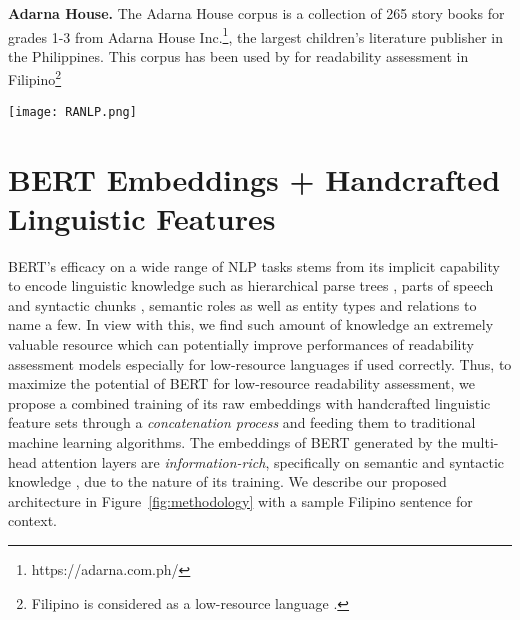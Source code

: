 \documentclass[11pt,a4paper]{article}
\begin{document}
\noindent\textbf{Adarna House.} The Adarna House corpus is a collection of 265 story books for grades 1-3 from Adarna House Inc.\footnote{https://adarna.com.ph/}, the largest children's literature publisher in the Philippines. This corpus has been used by \citet{imperial2019developing, imperial2020exploring, imperial2021application} for readability assessment in Filipino\footnote{Filipino is considered as a low-resource language \cite{cruz-etal-2020-resource,cruz-etal-2020-localization}.}



\begin{figure*}[!htbp]
    \centering
    \texttt{[image: RANLP.png]}
    \caption{The proposed combined training approach using sentence embeddings from BERT model and extracted handcrafted linguistic feature sets.}
    \label{fig:methodology}
\end{figure*}


\section{BERT Embeddings + Handcrafted Linguistic Features}
BERT's efficacy on a wide range of NLP tasks stems from its implicit capability to encode linguistic knowledge such as hierarchical parse trees \cite{hewitt-manning-2019-structural}, parts of speech and syntactic chunks \cite{liu-etal-2019-linguistic,tenney2019}, semantic roles \cite{ettinger2019} as well as entity types and relations \cite{tenney2019} to name a few. In view with this, we find such amount of knowledge an extremely valuable resource which can potentially improve performances of readability assessment models especially for low-resource languages if used correctly. Thus, to maximize the potential of BERT for low-resource readability assessment, we propose a combined training of its raw embeddings with handcrafted linguistic feature sets through a \textit{concatenation process} and feeding them to traditional machine learning algorithms. The embeddings of BERT generated by the multi-head attention layers are \textit{information-rich}, specifically on semantic and syntactic knowledge \cite{rogers-etal-2020-primer}, due to the nature of its training. We describe our proposed architecture in Figure~\ref{fig:methodology} with a sample Filipino sentence for context.
\end{document}
